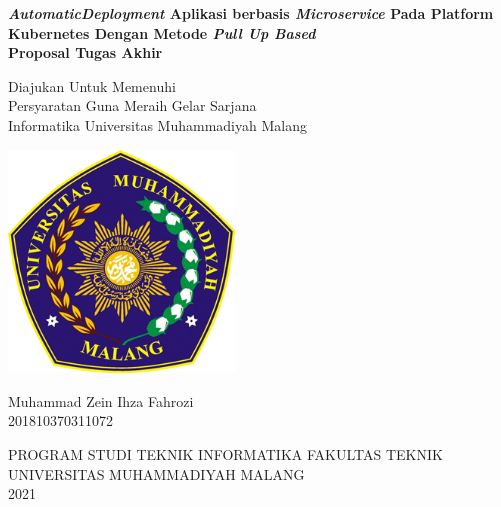 \begin{titlepage}
\begin{center}
	\onehalfspacing
	\large \bfseries \textit{AutomaticDeployment}  Aplikasi berbasis \textit{Microservice} Pada Platform Kubernetes Dengan Metode \textit{Pull Up Based} \\
	\vspace{1cm}
	 \large Proposal Tugas Akhir \\
	\vspace{0.5cm}
	
	{\small \normalfont Diajukan Untuk Memenuhi\\
	Persyaratan Guna Meraih Gelar Sarjana\\
	Informatika Universitas Muhammadiyah Malang}
	\vspace{2cm}
	
	\includegraphics[width=6cm]{images/logo_umm.png}
	
	\vspace{1cm}
	Muhammad Zein Ihza Fahrozi \\
	201810370311072 \\
	
	\vspace{3cm}
	
	\normalsize PROGRAM STUDI TEKNIK INFORMATIKA FAKULTAS TEKNIK \\
	UNIVERSITAS MUHAMMADIYAH MALANG \\
	2021
	

	
\end{center}

\end{titlepage}

\newpage